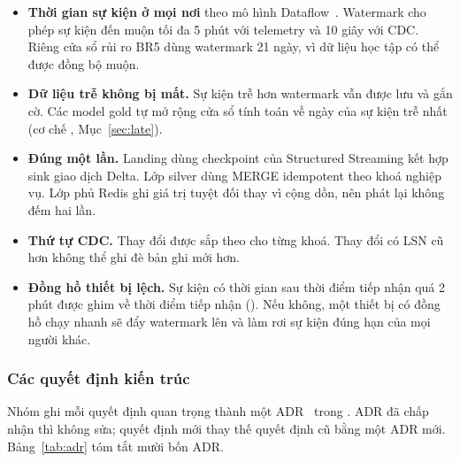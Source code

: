 \begin{itemize}
  \item \textbf{Thời gian sự kiện ở mọi nơi} theo mô hình Dataflow~\cite{akidau2015dataflow}. Watermark cho phép sự kiện đến muộn tối đa 5 phút với telemetry và 10 giây với CDC. Riêng cửa sổ rủi ro BR5 dùng watermark 21 ngày, vì dữ liệu học tập có thể được đồng bộ muộn.
  \item \textbf{Dữ liệu trễ không bị mất.} Sự kiện trễ hơn watermark vẫn được lưu và gắn cờ. Các model gold tự mở rộng cửa sổ tính toán về ngày của sự kiện trễ nhất (cơ chế , Mục~\ref{sec:late}).
  \item \textbf{Đúng một lần.} Landing dùng checkpoint của Structured Streaming kết hợp sink giao dịch Delta. Lớp silver dùng MERGE idempotent theo khoá nghiệp vụ. Lớp phủ Redis ghi giá trị tuyệt đối thay vì cộng dồn, nên phát lại không đếm hai lần.
  \item \textbf{Thứ tự CDC.} Thay đổi được sắp theo  cho từng khoá. Thay đổi có LSN cũ hơn không thể ghi đè bản ghi mới hơn.
  \item \textbf{Đồng hồ thiết bị lệch.} Sự kiện có thời gian sau thời điểm tiếp nhận quá 2 phút được ghim về thời điểm tiếp nhận (). Nếu không, một thiết bị có đồng hồ chạy nhanh sẽ đẩy watermark lên và làm rơi sự kiện đúng hạn của mọi người khác.
\end{itemize}

\subsubsection{Các quyết định kiến trúc}

Nhóm ghi mỗi quyết định quan trọng thành một ADR~\cite{nygard2011adr} trong . ADR đã chấp nhận thì không sửa; quyết định mới thay thế quyết định cũ bằng một ADR mới. Bảng~\ref{tab:adr} tóm tắt mười bốn ADR.


